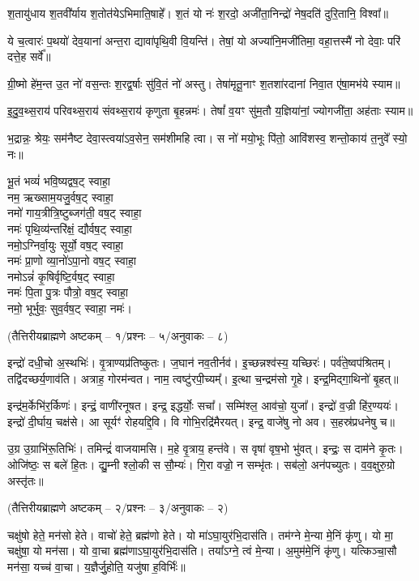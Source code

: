श॒तायु॑धाय श॒तवी᳚र्याय श॒तोत॑येऽभिमाति॒षाहे᳚।
श॒तं यो नः॑ श॒रदो॒ अजी॑ता॒निन्द्रो॑ नेष॒दति॑ दुरि॒तानि॒ विश्वा᳚॥

ये च॒त्वारः॑ प॒थयो॑ देव॒याना॑ अन्त॒रा द्यावा॑पृथि॒वी वि॒यन्ति॑।
तेषां॒ यो अज्या॑नि॒मजी॑तिमा॒ वहा॒त्तस्मै॑ नो देवाः॒ परि॑ दत्ते॒ह सर्वे᳚॥

ग्री॒ष्मो हे॑म॒न्त उ॒त नो॑ वस॒न्तः श॒रद्व॒र्षाः सु॑वि॒तं नो॑ अस्तु।
तेषा॑मृतू॒नाꣳ श॒तशा॑रदानां निवा॒त ए॑षा॒मभ॑ये स्याम॥

इ॒दु॒व॒थ्स॒राय॑ परिवथ्स॒राय॑ संवथ्स॒राय॑ कृणुता बृ॒हन्नमः॑।
तेषां᳚ व॒यꣳ सु॑म॒तौ य॒ज्ञिया॑नां॒ ज्योगजी॑ता॒ अह॑ताः स्याम॥

भ॒द्रान्नः॒ श्रेयः॒ सम॑नैष्ट देवा॒स्त्वया॑ऽव॒सेन॒ सम॑शीमहि त्वा।
स नो॑ मयो॒भूः पि॑तो॒ आवि॑शस्व॒ शन्तो॒काय॑ त॒नुवे᳚ स्यो॒ नः॥

भू॒तं भव्यं॑ भवि॒ष्यद्वष॒ट् स्वाहा॒\\
नम॒ ऋख्साम॒यजु॒र्वष॒ट् स्वाहा॒\\
नमो॑ गाय॒त्रीत्रि॒ष्टुब्जग॑ती॒ वष॒ट् स्वाहा॒\\
नमः॑ पृथि॒व्य॑न्तरि॑क्षं॒ द्यौर्वष॒ट् स्वाहा॒\\
नमो॒ऽग्निर्वा॒युः सूर्यो॒ वष॒ट् स्वाहा॒\\
नमः॑ प्रा॒णो व्या॒नो॑ऽपा॒नो वष॒ट् स्वाहा॒\\
नमोऽन्नं॑ कृ॒षिर्वृष्टि॒र्वष॒ट् स्वाहा॒\\
नमः॑ पि॒ता पु॒त्रः पौत्रो॒ वष॒ट् स्वाहा॒\\
नमो॒ भूर्भुवः॒ सुव॒र्वष॒ट् स्वाहा॒ नमः॑।

\centerline{\scriptsize (तैत्तिरीयब्राह्मणे अष्टकम् – १/प्रश्नः – ५/अनुवाकः – ८)}

इन्द्रो॑ दधी॒चो अ॒स्थभिः॑।
वृ॒त्राण्यप्र॑तिष्कुतः।
ज॒घान॑ नव॒तीर्नव॑।
इ॒च्छन्नश्व॑स्य॒ यच्छिरः॑।
पर्व॑ते॒ष्वप॑श्रितम्।
तद्वि॑दच्छर्य॒णाव॑ति।
अत्राह॒ गोरम॑न्वत।
नाम॒ त्वष्टु॑रपी॒च्यम्᳚।
इ॒त्था च॒न्द्रम॑सो गृ॒हे।
इन्द्र॒मिद्गा॒थिनो॑ बृ॒हत्॥

इन्द्र॑म॒र्केभि॑र॒र्किणः॑।
इन्द्रं॒ वाणी॑रनूषत।
इन्द्र॒ इद्धर्योः॒ सचा᳚।
सम्मि॑श्ल॒ आव॑चो॒ युजा᳚।
इन्द्रो॑ व॒ज्री हि॑र॒ण्ययः॑।
इन्द्रो॑ दी॒र्घाय॒ चक्ष॑से।
आ सूर्यꣳ॑ रोहयद्दि॒वि।
वि गोभि॒रद्रि॑मैरयत्।
इन्द्र॒ वाजे॑षु नो अव।
स॒हस्र॑प्रधनेषु च॥

उ॒ग्र उ॒ग्राभि॑रू॒तिभिः॑।
तमिन्द्रं॑ वाजयामसि।
म॒हे वृ॒त्राय॒ हन्त॑वे।
स वृषा॑ वृष॒भो भु॑वत्।
इन्द्रः॒ स दाम॑ने कृ॒तः।
ओजि॑ष्ठः॒ स बले॑ हि॒तः।
द्यु॒म्नी श्लो॒की स सौ॒म्यः॑।
गि॒रा वज्रो॒ न सम्भृ॑तः।
सब॑लो॒ अन॑पच्युतः।
व॒व॒क्षुरु॒ग्रो अस्तृ॑तः॥

\centerline{\scriptsize (तैत्तिरीयब्राह्मणे अष्टकम् – २/प्रश्नः – ३/अनुवाकः – २)}
चक्षु॑षो हेते॒ मन॑सो हेते।
वाचो॑ हेते॒ ब्रह्म॑णो हेते।
यो मा॑ऽघा॒युर॑भि॒दास॑ति।
तम॑ग्ने मे॒न्या मे॒निं कृ॑णु।
यो मा॒ चक्षु॑षा॒ यो मन॑सा।
यो वा॒चा ब्रह्म॑णाऽघा॒युर॑भि॒दास॑ति।
तया᳚ऽग्ने॒ त्वं मे॒न्या।
अ॒मुम॑मे॒निं कृ॑णु।
यत्किञ्चा॒सौ मन॑सा॒ यच्च॑ वा॒चा।
य॒ज्ञैर्जु॒होति॒ यजु॑षा ह॒विर्भिः॑॥

